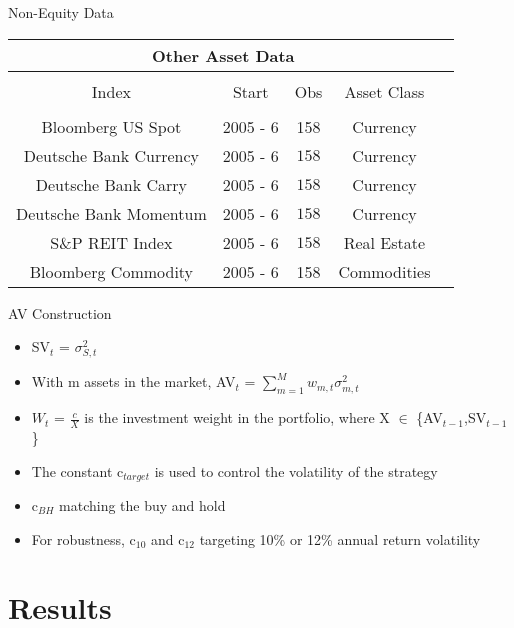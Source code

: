 \documentclass[handout]{beamer}
\begin{document}
\begin{frame}{Non-Equity Data}
	\begin{adjustbox}{width=\textwidth}
		\begin{tabular}{ccccc}
			\multicolumn{4}{c}{Other Asset Data}\\
			\hline \hline \\[-1.8ex] 
			Index & Start & Obs & Asset Class\\
			\hline\\
			Bloomberg US Spot & 2005 - 6 & 158 & Currency\\
			Deutsche Bank Currency & 2005 - 6 & $158$& Currency \\ 
			Deutsche Bank Carry & 2005 - 6 & $158$& Currency \\ 
			Deutsche Bank Momentum & 2005 - 6 & $158$& Currency \\ 
			S\&P REIT Index & 2005 - 6 & $158$& Real Estate \\
			Bloomberg Commodity & 2005 - 6 &158 & Commodities\\
			\hline
		\end{tabular}
	\end{adjustbox}
\end{frame}
\begin{frame}{AV Construction}
		\begin{itemize}
			\item SV$_{t}$ = $\sigma^{2}_{S,t}$
			\item With m assets in the market, AV$_{t}$ = $\sum_{m=1}^{M} w_{m,t}\sigma^{2}_{m,t}$
			\item $W_{t}$ = $\frac{c}{X}$ is the investment weight in the portfolio, where X $\in$ \{AV$_{t-1}$,SV$_{t-1}$\}
			\item The constant c$_{target}$ is used to control the volatility of the strategy
			\item c$_{BH}$ matching the buy and hold
			\item For robustness, c$_{10}$ and c$_{12}$ targeting 10\% or 12\% annual return volatility
		\end{itemize}
\end{frame}

\section{Results}
\end{document}

